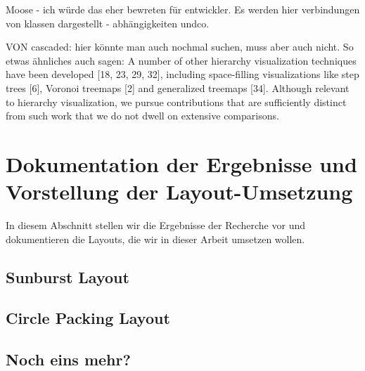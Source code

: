 Moose - ich würde das eher bewreten für entwickler. Es werden hier verbindungen von klassen dargestellt - abhängigkeiten undco.





VON cascaded: hier könnte man auch nochmal suchen, muss aber auch nicht.
So etwas ähnliches auch sagen:
A number of other hierarchy visualization techniques have been
developed [18, 23, 29, 32], including space-filling visualizations
like step trees [6], Voronoi treemaps [2] and generalized treemaps
[34]. Although relevant to hierarchy visualization, we pursue
contributions that are sufficiently distinct from such work that we
do not dwell on extensive comparisons. \cite{lu2008cascaded}


\section{Dokumentation der Ergebnisse und Vorstellung der Layout-Umsetzung} \label{sec:DokumentationLayoutUmsetzung}
In diesem Abschnitt stellen wir die Ergebnisse der Recherche vor und dokumentieren die Layouts, die wir in dieser Arbeit umsetzen wollen. 

\subsection{Sunburst Layout}

\subsection{Circle Packing Layout}

\subsection{Noch eins mehr?}